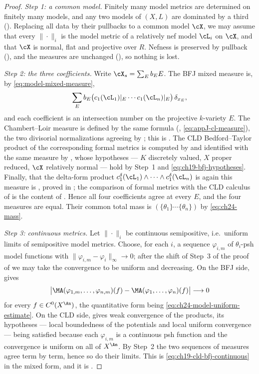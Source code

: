 \begin{proof}
\emph{Step 1: a common model.}  Finitely many model metrics are determined
on finitely many models, and any two models of \((X,L)\) are dominated by a
third ().  Replacing all data by their
pullbacks to a common model \(\cX\), we may assume that every
\(\|\cdot\|_i\) is the model metric of a relatively nef model
\(\cL_i\) on \(\cX\), and that \(\cX\) is normal, flat and projective over
\(R\).  Nefness is preserved by pullback (), and the
measures are unchanged (), so nothing is lost.

\emph{Step 2: the three coefficients.}  Write \(\cX_s=\sum_Eb_EE\).  The BFJ
mixed measure is, by \eqref{eq:model-mixed-measure},
\[
 \sum_Eb_E\bigl(c_1(\cL_1)|_E\cdots c_1(\cL_n)|_E\bigr)\,\delta_{x_E},
\]
and each coefficient is an intersection number on the projective
\(k\)-variety \(E\).  The Chambert--Loir measure is defined by the same
formula (, \eqref{eq:appJ-cl-measure}), the two
divisorial normalizations agreeing by ;
this is .  The CLD Bedford--Taylor product
of the corresponding formal metrics is computed by
 and identified with the same measure by
, whose hypotheses --- \(K\) discretely valued,
\(X\) proper reduced, \(\cX\) relatively normal --- hold by Step~1 and
\eqref{eq:ch19-bfj-hypotheses}.  Finally, that the delta-form product
\(c_1^\delta(\cL_1)\wedge\cdots\wedge c_1^\delta(\cL_n)\) is again this
measure is , proved in \cite{GK17,GK19}; the
comparison of formal metrics with the CLD calculus of \cite{CLD25} is the
content of .  Hence all four coefficients agree
at every \(E\), and the four measures are equal.  Their common total mass is
\((\{\theta_1\}\cdots\{\theta_n\})\) by \eqref{eq:ch24-mass}.

\emph{Step 3: continuous metrics.}  Let \(\|\cdot\|_i\) be continuous
semipositive, i.e.\ uniform limits of semipositive model metrics.  Choose,
for each \(i\), a sequence \(\varphi_{i,m}\) of \(\theta_i\)-psh model
functions with \(\|\varphi_{i,m}-\varphi_i\|_\infty\to0\); after the shift
of Step~3 of the proof of  we may take the
convergence to be uniform and decreasing.  On the BFJ side,
 gives
\[
 \bigl|\MA(\varphi_{1,m},\ldots,\varphi_{n,m})(f)
      -\MA(\varphi_1,\ldots,\varphi_n)(f)\bigr|
 \longrightarrow0
\]
for every \(f\in C^0(X^{\An})\), the quantitative form being
\eqref{eq:ch24-model-uniform-estimate}.  On the CLD side,
 gives weak convergence of the products, its
hypotheses --- local boundedness of the potentials and local uniform
convergence --- being satisfied because each \(\varphi_{i,m}\) is a
continuous psh function and the convergence is uniform on all of
\(X^{\An}\).  By Step~2 the two sequences of measures agree term by term,
hence so do their limits.  This is \eqref{eq:ch19-cld-bfj-continuous} in the
mixed form, and it is .
\end{proof}


